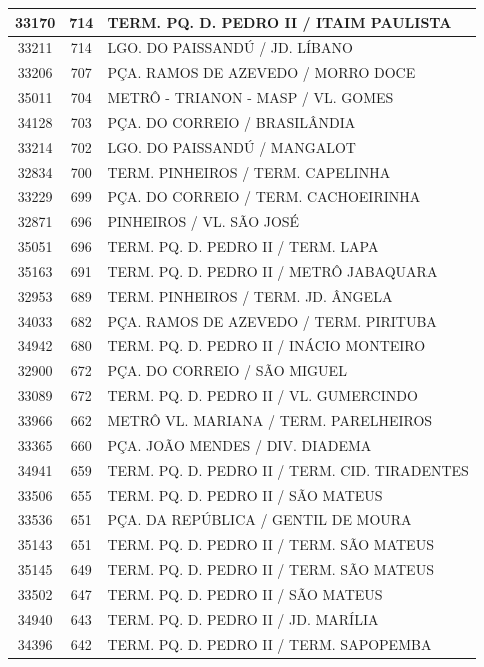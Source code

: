 \documentclass[
	12pt,				%
	oneside,			%
	a4paper,			%
	english,			%
	brazil				%
	]{abntex2ppgsi}
\begin{document}
{{{\begin{apendicesenv}
\begin{longtable}{c|c|p{7cm}}
 \hline 
33170 &	714 &	TERM. PQ. D. PEDRO II / ITAIM PAULISTA \\ 
 \hline 
33211 &	714 &	LGO. DO PAISSANDÚ / JD. LÍBANO \\ 
 \hline 
33206 &	707 &	PÇA. RAMOS DE AZEVEDO / MORRO DOCE \\ 
 \hline 
35011 &	704 &	METRÔ - TRIANON - MASP / VL. GOMES \\ 
 \hline 
34128 &	703 &	PÇA. DO CORREIO / BRASILÂNDIA \\ 
 \hline 
33214 &	702 &	LGO. DO PAISSANDÚ / MANGALOT \\ 
 \hline 
32834 &	700 &	TERM. PINHEIROS / TERM. CAPELINHA \\ 
 \hline 
33229 &	699 &	PÇA. DO CORREIO / TERM. CACHOEIRINHA \\ 
 \hline 
32871 &	696 &	PINHEIROS / VL. SÃO JOSÉ \\ 
 \hline 
35051 &	696 &	TERM. PQ. D. PEDRO II / TERM. LAPA \\ 
 \hline 
35163 &	691 &	TERM. PQ. D. PEDRO II / METRÔ JABAQUARA \\ 
 \hline 
32953 &	689 &	TERM. PINHEIROS / TERM. JD. ÂNGELA \\ 
 \hline 
34033 &	682 &	PÇA. RAMOS DE AZEVEDO / TERM. PIRITUBA \\ 
 \hline 
34942 &	680 &	TERM. PQ. D. PEDRO II / INÁCIO MONTEIRO \\ 
 \hline 
32900 &	672 &	PÇA. DO CORREIO / SÃO MIGUEL \\ 
 \hline 
33089 &	672 &	TERM. PQ. D. PEDRO II / VL. GUMERCINDO \\ 
 \hline 
33966 &	662 &	METRÔ VL. MARIANA / TERM. PARELHEIROS \\ 
 \hline 
33365 &	660 &	PÇA. JOÃO MENDES / DIV. DIADEMA \\ 
 \hline 
34941 &	659 &	TERM. PQ. D. PEDRO II / TERM. CID. TIRADENTES \\ 
 \hline 
33506 &	655 &	TERM. PQ. D. PEDRO II / SÃO MATEUS \\ 
 \hline 
33536 &	651 &	PÇA. DA REPÚBLICA / GENTIL DE MOURA \\ 
 \hline 
35143 &	651 &	TERM. PQ. D. PEDRO II / TERM. SÃO MATEUS \\ 
 \hline 
35145 &	649 &	TERM. PQ. D. PEDRO II / TERM. SÃO MATEUS \\ 
 \hline 
33502 &	647 &	TERM. PQ. D. PEDRO II / SÃO MATEUS \\ 
 \hline 
34940 &	643 &	TERM. PQ. D. PEDRO II / JD. MARÍLIA \\ 
 \hline 
34396 &	642 &	TERM. PQ. D. PEDRO II / TERM. SAPOPEMBA \\ 

\end{longtable}
\end{apendicesenv}}}}
\end{document}
